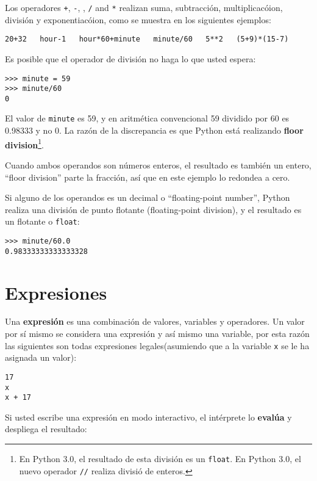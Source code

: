 Los operadores {\tt +}, {\tt -}, {\tt *}, {\tt /} and {\tt **}
realizan suma, subtracci\'on, multiplicac\'oion, divisi\'on y
exponentiac\'oion, como se muestra en los siguientes ejemplos:

\beforeverb
\begin{verbatim}
20+32   hour-1   hour*60+minute   minute/60   5**2   (5+9)*(15-7)
\end{verbatim}
\afterverb
%
Es posible que el operador de divisi\'on no haga lo que usted espera:

\beforeverb
\begin{verbatim}
>>> minute = 59
>>> minute/60
0
\end{verbatim}
\afterverb
%
El valor de {\tt minute} es 59, y en aritm\'etica convencional 59
dividido por 60 es 0.98333 y no 0.  La raz\'on de la discrepancia es que Python est\'a realizando {\bf floor division}\footnote{En Python 3.0,
el resultado de esta divisi\'on es un {\tt float}.  
En Python 3.0, el nuevo operador
{\tt //} realiza divisi\'o de enteros.}.


Cuando ambos operandos son n\'umeros enteros, el resultado es tambi\'en un entero, ``floor division'' parte la fracci\'on, as\'i que en este ejemplo lo redondea a cero.

Si alguno de los operandos es un decimal o ``floating-point number'', Python realiza una 
divisi\'on de punto flotante (floating-point division), y el resultado es un flotante o {\tt float}:

\beforeverb
\begin{verbatim}
>>> minute/60.0
0.98333333333333328
\end{verbatim}
\afterverb


\section{Expresiones}

Una {\bf expresi\'on} es una combinaci\'on de valores, variables y operadores.
Un valor por s\'i mismo se considera una expresi\'on y as\'i mismo una variable, por esta raz\'on las siguientes son todas expresiones legales(asumiendo que a la variable {\tt x} se le ha asignada un valor):


\beforeverb
\begin{verbatim}
17
x
x + 17
\end{verbatim}
\afterverb
%
Si usted escribe una expresi\'on en modo interactivo, el int\'erprete lo
{\bf eval\'ua} y despliega el resultado:


